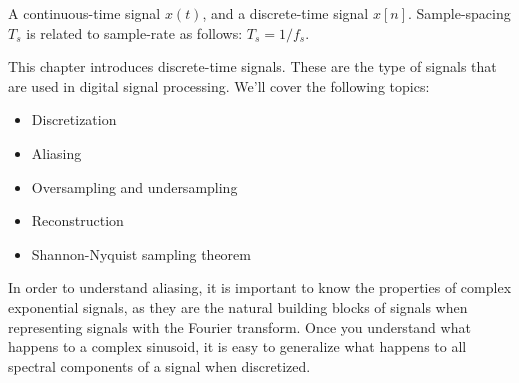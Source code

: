 \begin{marginfigure}
  \begin{center}
  \end{center}
  \caption{A continuous-time signal $x(t)$, and a discrete-time signal
    $x[n]$. Sample-spacing $T_s$ is related to sample-rate as follows:
    $T_s = 1/f_s$.}

\end{marginfigure}

This chapter introduces discrete-time signals. These are the type of
signals that are used in digital signal processing. We'll cover the
following topics:
\begin{itemize}
  \item Discretization
  \item Aliasing
  \item Oversampling and undersampling
  \item Reconstruction
  \item Shannon-Nyquist sampling theorem
\end{itemize}
In order to understand aliasing, it is important to know the
properties of complex exponential signals, as they are the natural
building blocks of signals when representing signals with the Fourier
transform. Once you understand what happens to a complex sinusoid, it
is easy to generalize what happens to all spectral components of a
signal when discretized.

